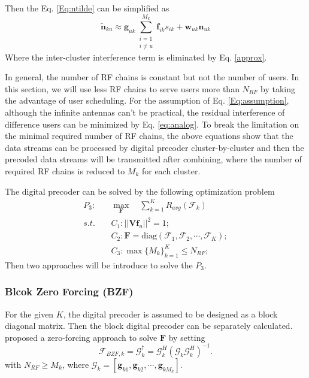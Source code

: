 \documentclass[conference]{IEEEtran}
\begin{document}
Then the Eq. \eqref{Eq:ntilde} can be simplified as 
\begin{equation}
\tilde{\bm{n}}_{ku} \approx	\bm{g}_{uk}\sum_{\substack{i=1\\i\neq u}}^{M_k}\bm{f}_{ik}s_{ik}+\bm{w}_{uk}\bm{n}_{uk}
\end{equation}
Where the inter-cluster interference term is eliminated by Eq. \eqref{approx}.

In general, the number of RF chains is constant but not the number of users. In this section, we will use less RF chains to serve users more than $N_{RF}$ by taking the advantage of user scheduling. For the assumption of Eq. \eqref{Eq:assumption},  although the infinite antennas can't be practical, the residual interference of difference users can be minimized by Eq. \eqref{eq:analog}. To break the limitation on the minimal required number of RF chains, the above equations show that the data streams can be processed by digital precoder cluster-by-cluster and then the precoded data streams will be transmitted after combining, where the number of required RF chains is reduced to $M_k$ for each cluster.  

The digital precoder can be solved by the following optimization problem
\begin{align}\label{eq:digital}
P_3: \quad&\max_{\bm F}\quad \sum_{k=1}^{K} R_{avg}(\bm{\mathcal{F}}_k)\\ \nonumber
s.t. \quad &C_1: ||\bm{Vf}_u||^2=1;\nonumber\\
&C_2: \bm{F} = \text{diag}(\bm{\mathcal{F}}_1, \bm{\mathcal{F}}_2, \cdots, \bm{\mathcal{F}}_{K});\nonumber\\
&C_3: \max \{M_k\}_{k=1}^K \leq N_{RF};\nonumber
\end{align}
Then two approaches will be introduce to solve the $P_3$.

\subsubsection{Blcok Zero Forcing (BZF)}
For the given $K$, the digital precoder is assumed to be designed as a block diagonal matrix. Then the block digital precoder can be separately calculated. \cite{alkhateeb2014channel} proposed a zero-forcing approach to solve $\bm{F}$ by setting
\begin{equation}
\bm{\mathcal{F}}_{BZF,k} = \bm{\mathcal{G}}_k^\dagger = \bm{\mathcal{G}}_k^H (\bm{\mathcal{G}}_k \bm{\mathcal{G}}_k^H)^{-1}.
\end{equation}
with $N_{RF}\geq M_k$, where $\bm{\mathcal{G}}_k = [\bm{g}_{k1}, \bm{g}_{k2},\cdots,\bm{g}_{kM_k}]$.
\end{document}
